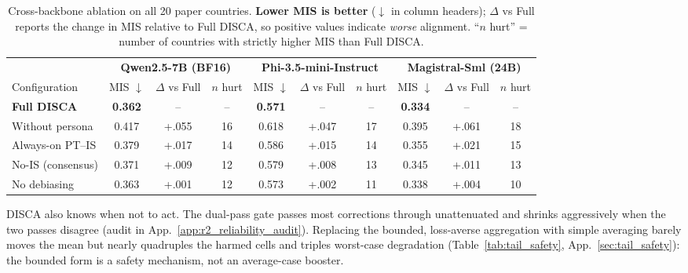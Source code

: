\documentclass{article}
\providecommand{\loss}{}\renewcommand{\loss}[1]{\textcolor{worsered}{#1}}
\begin{document}
\begin{table}[!htb]
\vspace{-0.2cm}
\caption{Cross-backbone ablation on all 20 paper countries. \textbf{Lower MIS is better} ($\downarrow$ in column headers); $\Delta$ vs Full reports the change in MIS relative to Full DISCA, so positive values indicate \emph{worse} alignment. ``$n$ hurt'' = number of countries with strictly higher MIS than Full DISCA.}
\label{tab:ablation_backbones_20c}
\centering\scriptsize
\setlength{\tabcolsep}{3.5pt}
\begin{tabular}{l ccc ccc ccc}
\toprule
& \multicolumn{3}{c}{\textbf{Qwen2.5-7B (BF16)}} & \multicolumn{3}{c}{\textbf{Phi-3.5-mini-Instruct}} & \multicolumn{3}{c}{\textbf{Magistral-Sml (24B)}} \\
\cmidrule(lr){2-4}\cmidrule(lr){5-7}\cmidrule(lr){8-10}
Configuration & MIS $\downarrow$ & $\Delta$ vs Full & $n$ hurt & MIS $\downarrow$ & $\Delta$ vs Full & $n$ hurt & MIS $\downarrow$ & $\Delta$ vs Full & $n$ hurt \\
\midrule
\textbf{Full DISCA}   & \textbf{0.362} & --            & -- & \textbf{0.571} & --            & -- & \textbf{0.334} & --            & -- \\
\midrule
Without persona       & 0.417          & \loss{+.055}  & 16 & 0.618          & \loss{+.047}  & 17 & 0.395          & \loss{+.061}  & 18 \\
Always-on PT--IS      & 0.379          & \loss{+.017}  & 14 & 0.586          & \loss{+.015}  & 14 & 0.355          & \loss{+.021}  & 15 \\
No-IS (consensus)     & 0.371          & \loss{+.009}  & 12 & 0.579          & \loss{+.008}  & 13 & 0.345          & \loss{+.011}  & 13 \\
No debiasing          & 0.363          & \loss{+.001}  & 12 & 0.573          & \loss{+.002}  & 11 & 0.338          & \loss{+.004}  & 10 \\
\bottomrule
\end{tabular}
\end{table}

DISCA also knows when not to act. The dual-pass gate passes most corrections through unattenuated and shrinks aggressively when the two passes disagree (audit in App.~\ref{app:r2_reliability_audit}). Replacing the bounded, loss-averse aggregation with simple averaging barely moves the mean but nearly quadruples the harmed cells and triples worst-case degradation (Table~\ref{tab:tail_safety}, App.~\ref{sec:tail_safety}): the bounded form is a safety mechanism, not an average-case booster.
\end{document}
